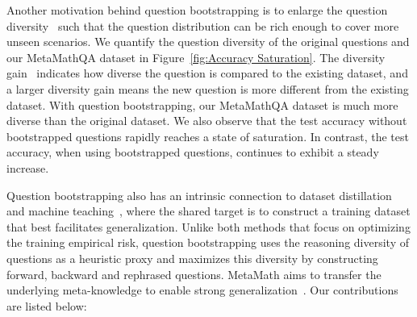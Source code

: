     Another motivation behind question bootstrapping is to enlarge the question diversity~\citep{eldan2023tinystories} such that the question distribution can be rich enough to cover more unseen scenarios. We quantify the question diversity of the original questions and our MetaMathQA dataset in Figure~\ref{fig:Accuracy Saturation}. The diversity gain~\citep{bilmes2022submodularity} indicates how diverse the question is compared to the existing dataset, and a larger diversity gain means the new question is more different from the existing dataset. With question bootstrapping, our MetaMathQA dataset is much more diverse than the original dataset. We also observe that the test accuracy without bootstrapped questions rapidly reaches a state of saturation. In contrast, the test accuracy, when using bootstrapped questions, continues to exhibit a steady increase.

    Question bootstrapping also has an intrinsic connection to dataset distillation~\cite{wang2018dataset,zhao2020dataset} and machine teaching~\cite{zhu2015machine,liu2017iterative,liu2021iterative,qiu2023iterative}, where the shared target is to construct a training dataset that best facilitates generalization. Unlike both methods that focus on optimizing the training empirical risk, question bootstrapping uses the reasoning diversity of questions as a heuristic proxy and maximizes this diversity by constructing forward, backward and rephrased questions. MetaMath aims to transfer the underlying meta-knowledge to enable strong generalization~\cite{kilbertus2018generalization}. Our contributions are listed below:

